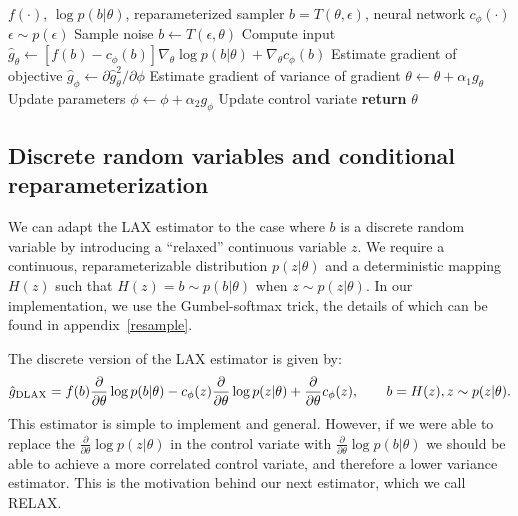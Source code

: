 \documentclass{article}
\newcommand{\PT}{\frac{\partial}{\partial \theta}}
\newcommand{\LAX}{{\textnormal{LAX}}}
\newcommand{\DLAX}{{\textnormal{DLAX}}}
\begin{document}
\begin{algorithm}[h]
\begin{algorithmic}
\Require $f(\cdot)$, $\log p(b|\theta)$, reparameterized sampler $b = T(\theta, \epsilon)$, neural network $c_\phi(\cdot)$
	\State $\epsilon \sim p(\epsilon)$ \Comment Sample noise
	\State $b \leftarrow T(\epsilon, \theta)$ \Comment Compute input
	\State  $\hat g_\theta \leftarrow \left[f(b) - c_{\phi}(b) \right] \nabla_\theta \log p(b|\theta) + \nabla_\theta c_\phi(b)$ \Comment Estimate gradient of objective
	\State  $\hat g_\phi \leftarrow \partial \hat g_\theta^2 / \partial \phi$ \Comment Estimate gradient of variance of gradient
	\State $\theta \leftarrow \theta + \alpha_1 g_\theta$ \Comment Update parameters
	\State $\phi \leftarrow \phi + \alpha_2 g_\phi$ \Comment Update control variate
\EndWhile
\State \textbf{return} $\theta$ 
\end{algorithmic}
\caption{\LAX{}: Optimizing parameters and a gradient control variate simultaneously.}
\label{lax}
\end{algorithm}

\subsection{Discrete random variables and conditional reparameterization}
We can adapt the \LAX{} estimator to the case where $b$ is a discrete random variable by introducing a ``relaxed'' continuous variable $z$.
We require a continuous, reparameterizable distribution $p(z|\theta)$ and a deterministic mapping $H(z)$ such that $H(z) = b \sim p(b|\theta)$ when $z \sim p(z|\theta)$.
In our implementation, we use the Gumbel-softmax trick, the details of which can be found in appendix~\ref{resample}.

The discrete version of the \LAX{} estimator is given by:
%
\begin{align}
\label{eq:discrete lax}
\hat g_\DLAX = f(b) \PT \log p(b|\theta) - c_\phi(z) \PT \log p(z|\theta) + \PT c_\phi(z), \qquad b = H(z), z \sim p(z|\theta).
\end{align}
%
This estimator is simple to implement and general.
However, if we were able to replace the $\PT \log p(z|\theta)$ in the control variate with $\PT \log p(b|\theta)$ we should be able to achieve a more correlated control variate, and therefore a lower variance estimator. This is the motivation behind our next estimator, which we call RELAX.

\end{document}
